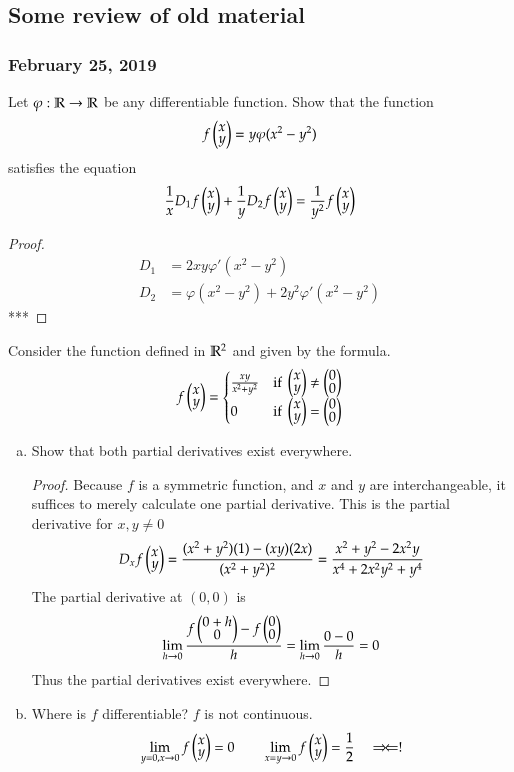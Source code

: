 \subsection*{Some review of old material}
\subsubsection*{February 25, 2019}

 Let $\varphi : \mathbb{R} \to \mathbb{R}$ be any differentiable function. Show that the function
\[f\Point{x \\ y} = y\varphi (x^2-y^2)\]
satisfies the equation
\[\frac{1}{x}D_1f\Point{x \\ y}+\frac{1}{y}D_2f\Point{x \\ y}=\frac{1}{y^2}f\Point{x \\ y}\]

\begin{proof}
  \begin{align*}
  D_1 &= 2xy\varphi'(x^2-y^2) \\
  D_2 &= \varphi(x^2-y^2) + 2y^2 \varphi'(x^2-y^2)
\end{align*}
***
 \end{proof}

 Consider the function defined in $\mathbb{R}^2$ and given by the formula.
\[f\Point{x \\ y} = \begin{cases} \frac{xy}{x^2+y^2} &\text{if } \def\arraystretch{0.7}\Point{x \\ y}\neq \Point{0 \\ 0} \\
0 &\text{if } \def\arraystretch{0.7}\Point{x \\ y}= \Point{0 \\ 0}
\end{cases}\]
\begin{enumerate}[a.]
  \item Show that both partial derivatives exist everywhere.

  \begin{proof}
    Because $f$ is a symmetric function, and $x$ and $y$ are interchangeable, it suffices to merely calculate one partial derivative. This is the partial derivative for $x,y\neq 0$
    \[D_xf\Point{x \\ y} = \frac{(x^2+y^2)(1)-(xy)(2x)}{(x^2+y^2)^2} = \frac{x^2+y^2-2x^2y}{x^4+2x^2y^2+y^4}\]
    The partial derivative at $(0,0)$ is
    \[\lim_{h\to 0} \frac{f\Point{0 + h \\ 0} - f\Point{0 \\ 0}}{h} = \lim_{h\to 0} \frac{0 - 0}{h} = 0\]
    Thus the partial derivatives exist everywhere.
  \end{proof}

  \item Where is $f$ differentiable?
  $f$ is not continuous.
  \[\lim_{y=0, x\to 0} f\Point{x \\ y} = 0 \qquad \lim_{x=y \to 0}f\Point{x \\ y} = \frac{1}{2} \quad \Rightarrow\!\Leftarrow !\]
\end{enumerate}

